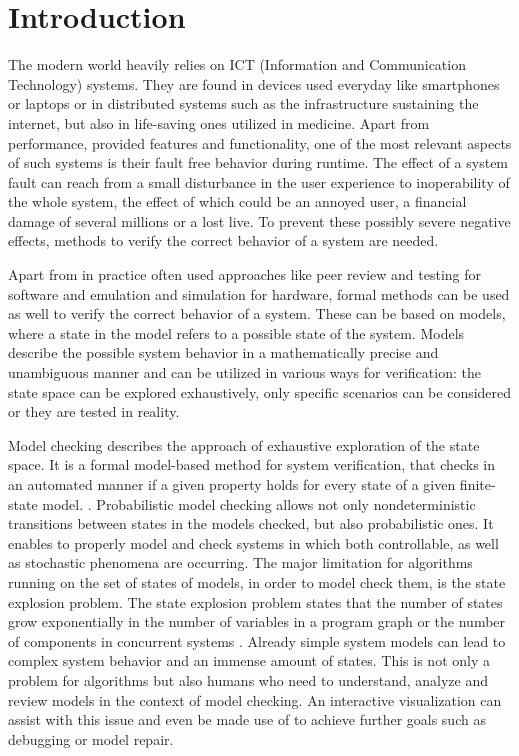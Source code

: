 \documentclass[preview]{standalone}
\begin{document}
\section{Introduction}
	
The modern world heavily relies on ICT (Information and Communication Technology) systems. They are found in devices used everyday like smartphones or laptops or in distributed systems such as the infrastructure sustaining the internet, but also in life-saving ones utilized in medicine. Apart from performance, provided features and functionality, one of the most relevant aspects of such systems is their fault free behavior during runtime. The effect of a system fault can reach from a small disturbance in the user experience to inoperability of the whole system, the effect of which could be an annoyed user, a financial damage of several millions or a lost live. To prevent these possibly severe negative effects, methods to verify the correct behavior of a system are needed.

Apart from in practice often used approaches like peer review and testing for software and emulation and simulation for hardware, formal methods can be used as well to verify the correct behavior of a system. 
These can be based on models, where a state in the model refers to a possible state of the system. Models describe the possible system behavior in a mathematically precise and unambiguous manner and can be utilized in various ways for verification: the state space can be explored exhaustively, only specific scenarios can be considered or they are tested in reality.

Model checking describes the approach of exhaustive exploration of the state space. It is a formal model-based method for system verification, that checks in an automated manner if a given property holds for every state of a given finite-state model. \cite[chs. 1.1 and 1.2]{Baier2008}. Probabilistic model checking allows not only nondeterministic transitions between states in the models checked, but also probabilistic ones. It enables to properly model and check systems in which both controllable, as well as stochastic phenomena are occurring. The major limitation for algorithms running on the set of states of models, in order to model check them, is the state explosion problem. The state explosion problem states that the number of states grow exponentially in the number of variables in a program graph or the number of components in concurrent systems \cite[ch. 2.3]{Baier2008}. Already simple system models can lead to complex system behavior and an immense amount of states. This is not only a problem for algorithms but also humans who need to understand, analyze and review models in the context of model checking. An interactive visualization can assist with this issue and even be made use of to achieve further goals such as debugging or model repair. 
 
\end{document}
